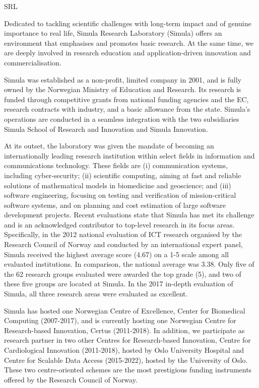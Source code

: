 \begin{sitedescription}{SRL}

Dedicated to tackling scientific challenges with long-term impact and of genuine importance to real life, Simula Research Laboratory (Simula) offers an environment that emphasises and promotes basic re­search. At the same time, we are deeply involved in research education and application-driven innova­tion and commercialisation.

Simula was established as a non-profit, limited company in 2001, and is fully owned by the Norwegian Ministry of Education and Research. Its research is funded through competitive grants from national funding agencies and the EC, research contracts with industry, and a basic allowance from the state. Simula’s operations are conducted in a seamless integration with the two subsidiaries Simula School of Research and Innovation and Simula Innovation.

At its outset, the laboratory was given the mandate of becoming an internationally leading research institution within se­lect fields in information and communications technology. These fields are (i) communication systems, including cyber-security; (ii) scientific computing, aiming at fast and reliable solutions of mathematical models in biomedicine and geoscience; and (iii) software engineering, focusing on testing and verification of mission-critical software systems, and on planning and cost estimation of large software development projects. Recent evaluations state that Simula has met its challenge and is an acknowledged contributor to top-level research in its focus areas. Specifically, in the 2012 national evaluation of ICT research organised by the Research Council of Norway and conducted by an international expert panel, Simula received the highest average score (4.67) on a 1-5 scale among all evaluated institutions. In comparison, the national average was 3.38. Only five of the 62 research groups evaluated were awarded the top grade (5), and two of these five groups are located at Simula. In the 2017 in-depth evaluation of Simula, all three research areas were evaluated as excellent.

Simula has hosted one Norwegian Centre of Excellence, Center for Biomedical Computing (2007-2017), and is currently hosting one Norwegian Centre for Research-based Innovation, Certus (2011-2018). In addition, we participate as research partner in two other Centres for Research-based Innovation, Centre for Cardiological Innovation (2011-2018), hosted by Oslo University Hospital and Centre for Scalable Data Access (2015-2022), hosted by the University of Oslo. These two centre-oriented schemes are the most prestigious funding instruments offered by the Research Council of Norway.


\end{sitedescription}
